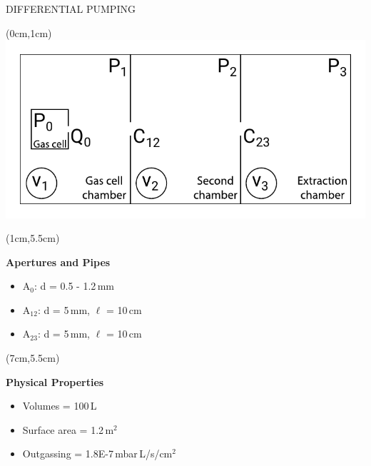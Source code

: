 \documentclass[9pt]{beamer}
\begin{document}
\begin{frame}{DIFFERENTIAL PUMPING}
    \begin{textblock*}{13cm}(0cm,1cm)
            \centering
            \includegraphics[scale=0.7]{assets/simpdiffsect.pdf}
    \end{textblock*}
    
    \begin{textblock*}{5cm}(1cm,5.5cm)
      \centering
      { \textbf{Apertures and Pipes}
      \begin{itemize}
          \item A$_0$: d = 0.5 - 1.2\,mm
          \item A$_{12}$: d = 5\,mm, $\ell$ = 10\,cm
          \item A$_{23}$: d = 5\,mm, $\ell$ = 10\,cm
      \end{itemize}}
    \end{textblock*}
    
    \begin{textblock*}{5cm}(7cm,5.5cm)
      \centering
      {\textbf{Physical Properties}
        \begin{itemize}
          \item Volumes = 100\,L
          \item Surface area = 1.2\,m$^2$
          \item Outgassing = 1.8E-7\,mbar\,L/s/cm$^2$
        \end{itemize}}
    \end{textblock*}
\end{frame}
\end{document}
